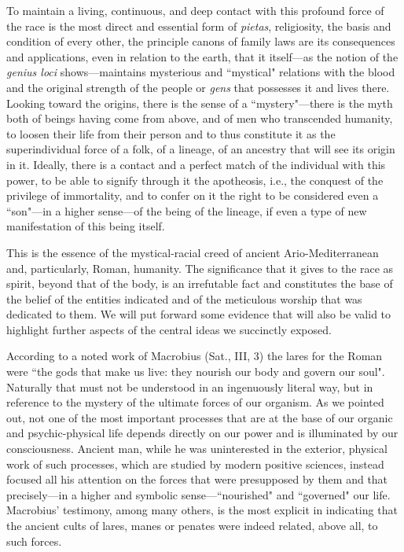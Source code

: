 To maintain a living, continuous, and deep contact with this profound force of the race is the most direct and essential form of \emph{pietas}, religiosity, the basis and condition of every other, the principle canons of family laws are its consequences and applications, even in relation to the earth, that it itself—as the notion of the \emph{genius loci} shows—maintains mysterious and ``mystical" relations with the blood and the original strength of the people or \emph{gens} that possesses it and lives there. Looking toward the origins, there is the sense of a ``mystery"—there is the myth both of beings having come from above, and of men who transcended humanity, to loosen their life from their person and to thus constitute it as the superindividual force of a folk, of a lineage, of an ancestry that will see its origin in it. Ideally, there is a contact and a perfect match of the individual with this power, to be able to signify through it the apotheosis, i.e., the conquest of the privilege of immortality, and to confer on it the right to be considered even a ``son"—in a higher sense—of the being of the lineage, if even a type of new manifestation of this being itself.

This is the essence of the mystical-racial creed of ancient Ario-Mediterranean and, particularly, Roman, humanity. The significance that it gives to the race as spirit, beyond that of the body, is an irrefutable fact and constitutes the base of the belief of the entities indicated and of the meticulous worship that was dedicated to them. We will put forward some evidence that will also be valid to highlight further aspects of the central ideas we succinctly exposed.

According to a noted work of Macrobius (Sat., III, 3) the lares for the Roman were ``the gods that make us live: they nourish our body and govern our soul". Naturally that must not be understood in an ingenuously literal way, but in reference to the mystery of the ultimate forces of our organism. As we pointed out, not one of the most important processes that are at the base of our organic and psychic-physical life depends directly on our power and is illuminated by our consciousness. Ancient man, while he was uninterested in the exterior, physical work of such processes, which are studied by modern positive sciences, instead focused all his attention on the forces that were presupposed by them and that precisely—in a higher and symbolic sense—``nourished" and ``governed" our life. Macrobius' testimony, among many others, is the most explicit in indicating that the ancient cults of lares, manes or penates were indeed related, above all, to such forces.

